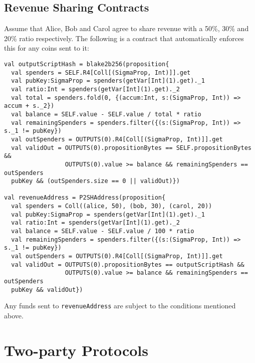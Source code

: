 \documentclass[11pt]{article}
\begin{document}
\subsection{Revenue Sharing Contracts}

Assume that Alice, Bob and Carol agree to share revenue with a 50\%, 30\% and 20\% ratio respectively. The following is a contract that automatically enforces this for any coins sent to it:


\begin{verbatim}
val outputScriptHash = blake2b256(proposition{
  val spenders = SELF.R4[Coll[(SigmaProp, Int)]].get
  val pubKey:SigmaProp = spenders(getVar[Int](1).get)._1
  val ratio:Int = spenders(getVar[Int](1).get)._2
  val total = spenders.fold(0, {(accum:Int, s:(SigmaProp, Int)) => accum + s._2})
  val balance = SELF.value - SELF.value / total * ratio
  val remainingSpenders = spenders.filter({(s:(SigmaProp, Int)) => s._1 != pubKey})
  val outSpenders = OUTPUTS(0).R4[Coll[(SigmaProp, Int)]].get
  val validOut = OUTPUTS(0).propositionBytes == SELF.propositionBytes &&
                 OUTPUTS(0).value >= balance && remainingSpenders == outSpenders
  pubKey && (outSpenders.size == 0 || validOut)})

val revenueAddress = P2SHAddress(proposition{
  val spenders = Coll((alice, 50), (bob, 30), (carol, 20))
  val pubKey:SigmaProp = spenders(getVar[Int](1).get)._1
  val ratio:Int = spenders(getVar[Int](1).get)._2
  val balance = SELF.value - SELF.value / 100 * ratio
  val remainingSpenders = spenders.filter({(s:(SigmaProp, Int)) => s._1 != pubKey})
  val outSpenders = OUTPUTS(0).R4[Coll[(SigmaProp, Int)]].get
  val validOut = OUTPUTS(0).propositionBytes == outputScriptHash &&
                 OUTPUTS(0).value >= balance && remainingSpenders == outSpenders
  pubKey && validOut})
\end{verbatim}
Any funds sent to \texttt{revenueAddress} are subject to the conditions mentioned above.
\section{Two-party Protocols}
\end{document}
